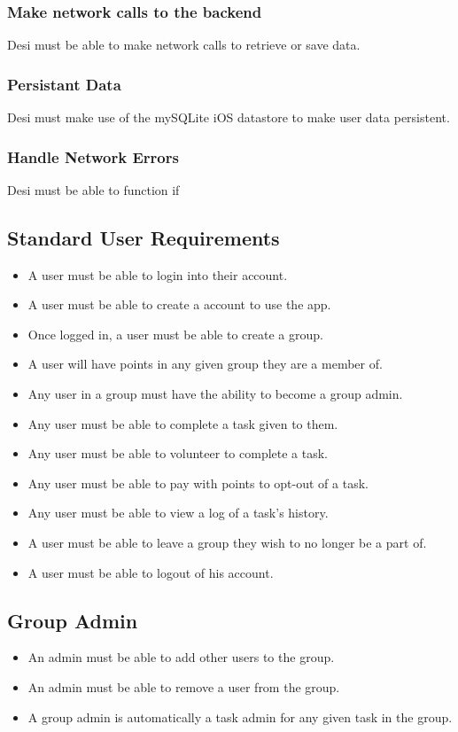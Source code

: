 \documentclass[11pt, a4paper]{report}
\begin{document}
\subsubsection{Make network calls to the backend}
Desi must be able to make network calls to retrieve or save data.
\subsubsection{Persistant Data}
Desi must make use of the mySQLite iOS datastore to make user data persistent.
\subsubsection{Handle Network Errors}
Desi must be able to function if 

\subsection{Standard User Requirements}
\begin{itemize} 
\item A user must be able to login into their account.
\item A user must be able to create a account to use the app.
\item Once logged in, a user must be able to create a group.
\item A user will have points in any given group they are a member of.
\item Any user in a group must have the ability to become a group admin.
\item Any user must be able to complete a task given to them.
\item Any user must be able to volunteer to complete a task.
\item Any user must be able to pay with points to opt-out of a task.
\item Any user must be able to view a log of a task's history.
\item A user must be able to leave a group they wish to no longer be a part of.
\item A user must be able to logout of his account.
 \end{itemize}


\subsection{Group Admin}
\begin{itemize}
\item An admin must be able to add other users to the group.
\item An admin must be able to remove a user from the group.
\item A group admin is automatically a task admin for any given task in the group.
\end{itemize}
\end{document}
